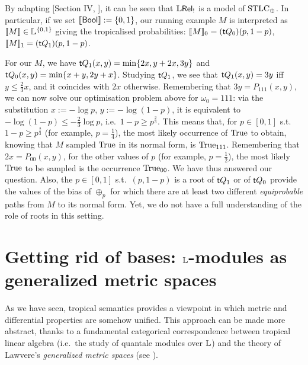 \documentclass[submission,%
]{eptcs}
\begin{document}
\begin{remark}
 By adapting [Section IV, \cite{Manzo2013}], it can be seen that $\mathbb{L} \mathsf{Rel}_!$ is a model of $\mathrm{STLC}_\oplus$.
 In particular, if we set $\llbracket\mathsf{Bool}\rrbracket:=\{0,1\}$, our running example $M$ is interpreted as $\llbracket M\rrbracket\in\mathbb{L}^{\{0,1\}}$ giving the tropicalised probabilities: $\llbracket M\rrbracket_0=(\mathsf{t} Q_0)(p,1-p)$, $\llbracket M\rrbracket_1=(\mathsf{t} Q_1)(p,1-p)$.
\end{remark}


For our $M$, we have $\mathsf{t} Q_1(x,y)=\min\{2x,y+2x,3y\}$ and $\mathsf{t} Q_0(x,y)=\min\{x+y,2y+x\}$.
Studying $\mathsf{t} Q_1$, we see that $\mathsf{t} Q_1(x,y)=3y$ iff $y\leq \frac{2}{3}x$, and it coincides with $2x$ otherwise.
Remembering that $3y=P_{111}(x,y)$, we can now solve our optimisation problem above for $\omega_0=111$:
via the substitution $x:=-\log p$, $y:=-\log (1-p)$, it is equivalent to $-\log (1-p)\leq -\frac{2}{3}\log p$, i.e.\ $1-p\geq p^{\frac{2}{3}}$.
This means that, for $p\in[0,1]$ s.t.\ $1-p\geq p^{\frac{2}{3}}$ (for example, $p=\frac{1}{4}$), the most likely occurrence of $\mathrm{True}$ to obtain, knowing that $M$ sampled $\mathrm{True}$ in its normal form, is $\mathrm{True}_{111}$.
Remembering that $2x=P_{00}(x,y)$, for the other values of $p$ (for example, $p=\frac{1}{2}$), the most likely $\mathrm{True}$ to be sampled is the occurrence $\mathrm{True}_{00}$.
We have thus answered our question.
Also, the $p\in[0,1]$ s.t.\ $(p,1-p)$ is a root of $\mathsf{t} Q_1$ or of $\mathsf{t} Q_0$ provide the values of the bias of $\oplus_p$ for which there are at least two different \emph{equiprobable} paths from $M$ to its normal form.
Yet, we do not have a full understanding of the role of roots in this setting.


\section{Getting rid of bases: $\mathbb{L}$-modules as generalized metric spaces}

As we have seen, tropical semantics provides a viewpoint in which metric and differential properties are somehow unified. This approach can be made more abstract, thanks to a fundamental categorical correspondence between tropical linear algebra (i.e.~the study of quantale modules over $\mathbb{L}$) and the theory of Lawvere's \emph{generalized metric spaces} (see \cite{Fuji, Stubbe2006}).
\end{document}
